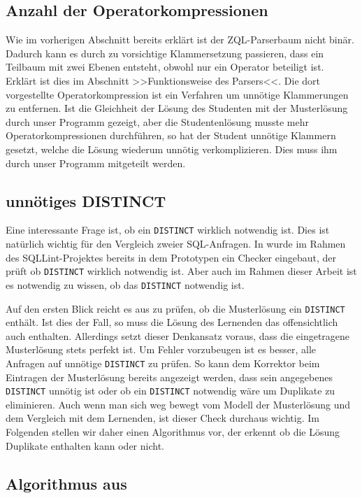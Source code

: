 \subsection{Anzahl der Operatorkompressionen}

Wie im vorherigen Abschnitt bereits erklärt ist der ZQL-Parserbaum nicht binär. Dadurch kann es durch zu vorsichtige Klammersetzung passieren, dass ein Teilbaum mit zwei Ebenen entsteht, obwohl nur ein Operator beteiligt ist. Erklärt ist dies im Abschnitt >>Funktionsweise des Parsers<<. Die dort vorgestellte Operatorkompression ist ein Verfahren um unnötige Klammerungen zu entfernen. Ist die Gleichheit der Lösung des Studenten mit der Musterlösung durch unser Programm gezeigt, aber die Studentenlösung musste mehr Operatorkompressionen durchführen, so hat der Student unnötige Klammern gesetzt, welche die Lösung wiederum unnötig verkomplizieren. Dies muss ihm durch unser Programm mitgeteilt werden.

\subsection{unnötiges DISTINCT}

Eine interessante Frage ist, ob ein \verb|DISTINCT| wirklich notwendig ist. Dies ist natürlich wichtig für den Vergleich zweier SQL-Anfragen. In \cite{brass2} wurde im Rahmen des SQLLint-Projektes bereits in dem Prototypen ein Checker eingebaut, der prüft ob \verb|DISTINCT| wirklich notwendig ist. Aber auch im Rahmen dieser Arbeit ist es notwendig zu wissen, ob das \verb|DISTINCT| notwendig ist. 

Auf den ersten Blick reicht es aus zu prüfen, ob die Musterlösung ein \verb|DISTINCT| enthält. Ist dies der Fall, so muss die Lösung des Lernenden das offensichtlich auch enthalten. Allerdings setzt dieser Denkansatz voraus, dass die eingetragene Musterlösung stets perfekt ist. Um Fehler vorzubeugen ist es besser, alle Anfragen auf unnötige \verb|DISTINCT| zu prüfen. So kann dem Korrektor beim Eintragen der Musterlösung bereits angezeigt werden, dass sein angegebenes \verb|DISTINCT| unnötig ist oder ob ein \verb|DISTINCT| notwendig wäre um Duplikate zu eliminieren. Auch wenn man sich weg bewegt vom Modell der Musterlösung und dem Vergleich mit dem Lernenden, ist dieser Check durchaus wichtig. Im Folgenden stellen wir daher einen Algorithmus vor, der erkennt ob die Lösung Duplikate enthalten kann oder nicht.

\subsection{Algorithmus aus \cite{sql1folien}}

